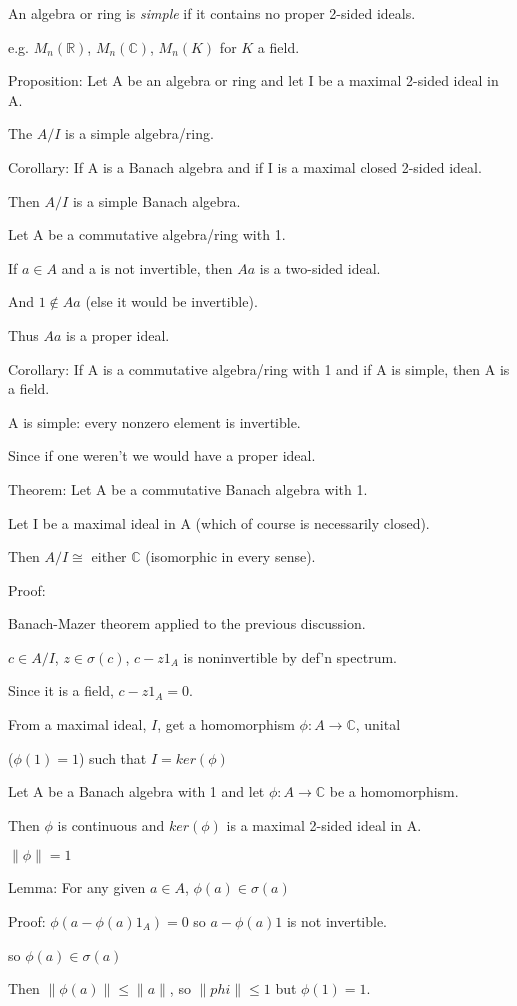 \documentclass[12pt]{article}
\newcommand{\n}{\noindent}
\begin{document}
\noindent
An algebra or ring is \textit{simple} if it contains no proper 2-sided ideals.

e.g. $M_n(\mathds{R})$, $M_n(\mathds{C})$, $M_n(K)$ for $K$ a field.

\n
Proposition: Let A be an algebra or ring and let I be a maximal 2-sided ideal in A.

The $A \slash I$ is a simple algebra/ring.

\n
Corollary: If A is a Banach algebra and if I is a maximal closed 2-sided ideal.

Then $A \slash I$ is a simple Banach algebra.

\n
Let A be a commutative algebra/ring with 1.

If $a \in A$ and a is not invertible, then $Aa$ is a two-sided ideal.

And $1 \not\in Aa$ (else it would be invertible).

Thus $Aa$ is a proper ideal.

\n
Corollary: If A is a commutative algebra/ring with 1 and if A is simple, then A is a field.

A is simple: every nonzero element is invertible.

Since if one weren't we would have a proper ideal.

\n
Theorem: Let A be a commutative Banach algebra with 1.

Let I be a maximal ideal in A (which of course is necessarily closed).

Then $A \slash I \cong$ either $\mathds{C}$ (isomorphic in every sense).

\n
Proof:

Banach-Mazer theorem applied to the previous discussion.

\n
$c \in A\slash I$, $z \in \sigma(c)$, $c - z1_{A}$ is noninvertible by def'n spectrum.

Since it is a field, $c - z1_{A} = 0$.

\n
From a maximal ideal, $I$, get a homomorphism $\phi: A \to \mathds{C}$, unital

($\phi(1) = 1$) such that $I = ker(\phi)$

\n
Let A be a Banach algebra with 1 and let $\phi: A \to \mathds{C}$ be a homomorphism.

Then $\phi$ is continuous and $ker(\phi)$ is a maximal 2-sided ideal in A.

$\|\phi\| = 1$

\n
Lemma: For any given $a \in A$, $\phi(a) \in \sigma(a)$

Proof: $\phi(a - \phi(a)1_A) = 0$ so $a - \phi(a)1$ is not invertible.

so $\phi(a) \in \sigma(a)$

Then $\|\phi(a)\| \leq \|a\|$, so $\|phi\| \leq 1$ but $\phi(1) = 1$.
\end{document}
